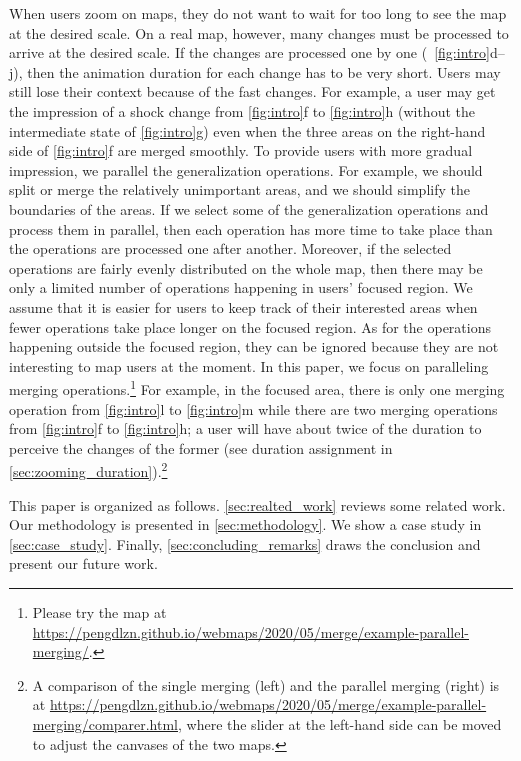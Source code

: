 \documentclass[]{interact}
\begin{document}
When users zoom on maps, 
they do not want to wait for too long to see the map at the desired scale.
On a real map, however, 
many changes must be processed to arrive at the desired scale.
If the changes are processed one by one 
(\eg~\figs\ref{fig:intro}d--j),
then the animation duration for each change has to be very short.
Users may still lose their context because of the fast changes.
For example, a user may get the impression of
a shock change from \fig\ref{fig:intro}f to \fig\ref{fig:intro}h
(without the intermediate state of \fig\ref{fig:intro}g)
even when the three areas on the right-hand side of \fig\ref{fig:intro}f
are merged smoothly.
To provide users with more gradual impression, 
we parallel the generalization operations.
For example, we should split or merge the relatively unimportant areas,
and we should simplify the boundaries of the areas.
If we select some of the generalization operations
and process them in parallel,
then each operation has more time to take place 
than the operations are processed one after another.
Moreover, if the selected operations are
fairly evenly distributed on the whole map, 
then there may be only a limited number of operations 
happening in users' focused region.
We assume that it is easier for users to keep track of their interested areas
when fewer operations take place longer on the focused region.
As for the operations happening outside the focused region,
they can be ignored because 
they are not interesting to map users at the moment.
In this paper, we focus on paralleling merging operations.\footnote{%
Please try the map at
\url{https://pengdlzn.github.io/webmaps/2020/05/merge/example-parallel-merging/}.}
For example, in the focused area, there is only one merging operation 
from \fig\ref{fig:intro}l to \fig\ref{fig:intro}m
while there are two merging operations  
from \fig\ref{fig:intro}f to \fig\ref{fig:intro}h;
a user will have about twice of the duration to perceive the changes of the former
(see duration assignment in \sect\ref{sec:zooming_duration}).\footnote{%
A comparison of the single merging (left) 
and the parallel merging (right) is at
\url{https://pengdlzn.github.io/webmaps/2020/05/merge/example-parallel-merging/comparer.html}, 
where the slider at the left-hand side can be 
moved to adjust the canvases of the two maps.}


This paper is organized as follows.
\sect\ref{sec:realted_work} reviews some related work.
Our methodology is presented in \sect\ref{sec:methodology}.
We show a case study in \sect\ref{sec:case_study}.
Finally, \sect\ref{sec:concluding_remarks} draws the conclusion
and present our future work.
\end{document}
